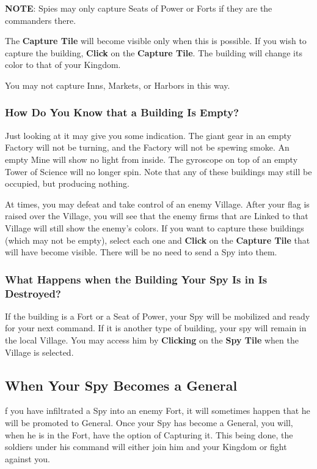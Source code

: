 \textbf{NOTE}: Spies may only capture Seats of Power or Forts if they are the commanders there.

The \textbf{Capture Tile} will become visible only when this is possible. If you wish to capture the building, \textbf{Click} on the \textbf{Capture Tile}. The building will change its color to that of your Kingdom.

You may not capture Inns, Markets, or Harbors in this way.

\subsubsection{\textsf{How Do You Know that a Building Is Empty?}}

Just looking at it may give you some indication. The giant gear in an empty Factory will not be turning, and the Factory will not be spewing smoke. An empty Mine will show no light from inside. The gyroscope on top of an empty Tower of Science will no longer spin. Note that any of these buildings may still be occupied, but producing nothing.

At times, you may defeat and take control of an enemy Village. After your flag is raised over the Village, you will see that the enemy firms that are Linked to that Village will still show the enemy’s colors. If you want to capture these buildings (which may not be empty), select each one and \textbf{Click} on the \textbf{Capture Tile} that will have become visible. There will be no need to send a Spy into them.

\subsubsection{\textsf{What Happens when the Building Your Spy Is in Is Destroyed?}}

If the building is a Fort or a Seat of Power, your Spy will be mobilized and ready for your next command. If it is another type of building, your spy will remain in the local Village. You may access him by \textbf{Clicking} on the \textbf{Spy Tile} when the Village is selected.

\subsection{\textsf{When Your Spy Becomes a General}}


f you have infiltrated a Spy into an enemy Fort, it will sometimes happen that he will be promoted to General. Once your Spy has become a General, you will, when he is in the Fort, have the option of Capturing it. This being done, the soldiers under his command will either join him and your Kingdom or fight against you.

